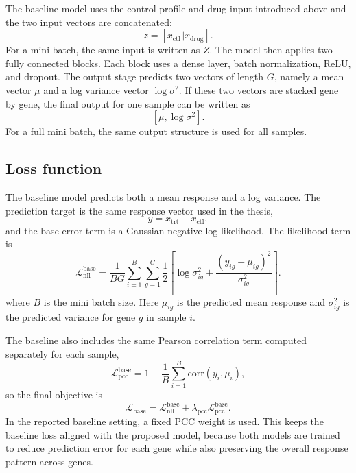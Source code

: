 \noindent The baseline model uses the control profile and drug input introduced above and the two input vectors are concatenated:
\begin{equation}
z = [x_{\mathrm{ctl}} \Vert x_{\mathrm{drug}}].
\end{equation}
For a mini batch, the same input is written as $Z$. The model then applies two fully connected blocks. Each block uses a dense layer, batch normalization, ReLU, and dropout. The output stage predicts two vectors of length $G$, namely a mean vector $\mu$ and a log variance vector $\log \sigma^{2}$. If these two vectors are stacked gene by gene, the final output for one sample can be written as
\begin{equation}
\left[\mu, \log \sigma^{2}\right].
\end{equation}
For a full mini batch, the same output structure is used for all samples.

\subsection{Loss function}
The baseline model predicts both a mean response and a log variance. The prediction target is the same response vector used in the thesis,
\begin{equation}
y = x_{\mathrm{trt}} - x_{\mathrm{ctl}},
\end{equation}
and the base error term is a Gaussian negative log likelihood. The likelihood term is
\begin{equation}
\mathcal{L}_{\mathrm{nll}}^{\mathrm{base}}=\frac{1}{BG}\sum_{i=1}^{B}\sum_{g=1}^{G}\frac{1}{2}\left[\log \sigma_{ig}^{2}+\frac{\left(y_{ig}-\mu_{ig}\right)^{2}}{\sigma_{ig}^{2}}\right].
\end{equation}
where $B$ is the mini batch size. Here $\mu_{ig}$ is the predicted mean response and $\sigma_{ig}^{2}$ is the predicted variance for gene $g$ in sample $i$.

\noindent The baseline also includes the same Pearson correlation term computed separately for each sample,
\begin{equation}
\mathcal{L}_{\mathrm{pcc}}^{\mathrm{base}} = 1-\frac{1}{B}\sum_{i=1}^{B}\mathrm{corr}\!\left(y_{i},\mu_{i}\right),
\end{equation}
so the final objective is
\begin{equation}
\mathcal{L}_{\mathrm{base}}=\mathcal{L}_{\mathrm{nll}}^{\mathrm{base}}+\lambda_{\mathrm{pcc}}\mathcal{L}_{\mathrm{pcc}}^{\mathrm{base}}.
\end{equation}
In the reported baseline setting, a fixed PCC weight is used. This keeps the baseline loss aligned with the proposed model, because both models are trained to reduce prediction error for each gene while also preserving the overall response pattern across genes.

